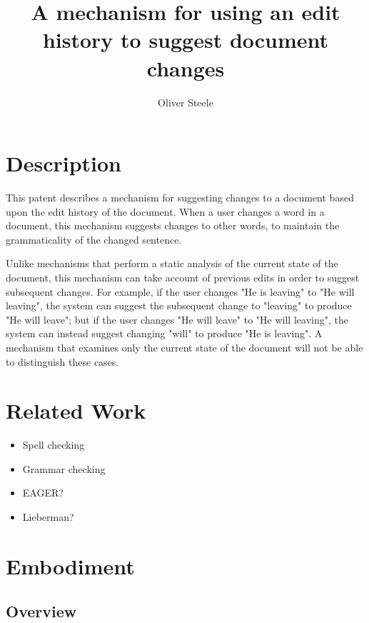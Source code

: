\documentclass{article}
\begin{document}
\title{A mechanism for using an edit history to suggest document changes}
\author{Oliver Steele}
\maketitle

\section{Description}

This patent describes a mechanism for suggesting changes to a document based upon the edit history of the document.  When a user changes a word in a document, this mechanism suggests changes to other words, to maintain the grammaticality of the changed sentence.

Unlike mechanisms that perform a static analysis of the current state of the document, this mechanism can take account of previous edits in order to suggest subsequent changes.  For example, if the user changes "He is leaving" to "He will leaving", the system can suggest the subsequent change to "leaving" to produce "He will leave"; but if the user changes "He will leave" to "He will leaving", the system can instead suggest changing "will" to produce "He is leaving".  A mechanism that examines only the current state of the document will not be able to distinguish these cases.

\section{Related Work}

\begin{itemize}
\item Spell checking
\item Grammar checking
\item EAGER?
\item Lieberman?
\end{itemize}

\section{Embodiment}

\subsection{Overview}
\end{document}

